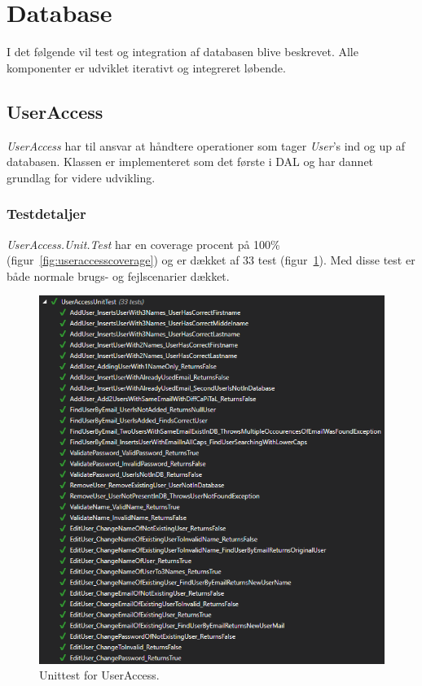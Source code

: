 \section{Database}\label{sec:testdatabase}
I det følgende vil test og integration af databasen blive beskrevet. Alle komponenter er udviklet iterativt og integreret løbende.

\subsection{UserAccess}
\textit{UserAccess} har til ansvar at håndtere operationer som tager \textit{User}'s ind og up af databasen. Klassen er implementeret som det første i DAL og har dannet grundlag for videre udvikling.

\subsubsection{Testdetaljer}
\textit{UserAccess.Unit.Test} har en coverage procent på 100\% (figur~\ref{fig:useraccesscoverage}) og er dækket af 33 test (figur~\ref{fig:useraccessunittest}). Med disse test er både normale brugs- og fejlscenarier dækket.

\begin{figure}[h]
\centering
\includegraphics[width=0.9\linewidth]{figs/test/useraccessunittest}
\caption{Unittest for UserAccess.}
\label{fig:useraccessunittest}
\end{figure}

